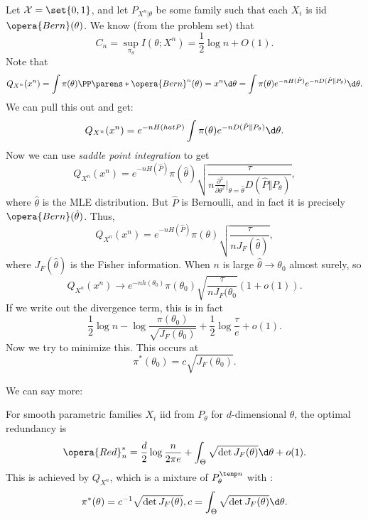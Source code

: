 \begin{exm}
	Let $\mathcal X = \set{0,1}$, and let $P_{X^n|\theta}$ be some family such that each $X_i$ is iid $\opera{Bern}(\theta)$. We know (from the problem set) that \[
		C_n = \sup_{\pi_\theta} I(\theta; X^n) = \frac 12 \log n + O(1).
	\]
	Note that \[
		Q_{X^n}(x^n) = \int \pi(\theta) \PP\parens*{\opera{Bern}^n(\theta) = x^n} \d \theta = \int \pi(\theta) e^{-nH(\hat P)} e^{-nD(\hat P \Vert P_\theta)} \d \theta.
	\]
	We can pull this out and get: \[
		Q_{X^n}(x^n) = e^{-nH(hat P)} \int \pi(\theta) e^{-n D(\hat P \Vert P_\theta)} \d \theta.
	\]
	Now we can use \emph{saddle point integration} to get \[
		Q_{X^n}(x^n) = e^{-n H(\hat P)} \pi(\hat\theta) \sqrt{\frac{\tau}{n \frac{\partial ^2}{\partial \theta^2} |_{\theta = \hat \theta} D(\hat P \Vert P_\theta)}},
	\]
	where $\hat\theta$ is the MLE distribution. But $\hat P$ is Bernoulli, and in fact it is precisely $\opera{Bern}(\hat \theta)$.
	Thus, \[
		Q_{X^n}(x^n) = e^{-nH(\hat P)} \pi(\theta) \sqrt{\frac{\tau}{nJ_F(\hat\theta)}},
	\]
	where $J_F(\hat\theta)$ is the Fisher information. When $n$ is large $\hat \theta \to \theta_0$ almost surely, so \[
		Q_{X^n}(x^n) \to e^{-nh(\theta_0)} \pi(\theta_0)  \sqrt{\frac{\tau}{nJ_F(\theta_0}} (1 + o(1)).
	\]
	If we write out the divergence term, this is in fact \[
		\frac 12 \log n - \log \frac{\pi(\theta_0)}{\sqrt{J_F(\theta_0)}} + \frac 12 \log \frac{\tau}{e} + o(1).
	\]
	Now we try to minimize this.
	This occurs at \[
		\pi^*(\theta_0) = c\sqrt{J_F(\theta_0)}.
	\]
\end{exm}

We can say more:

\begin{thm}
	For smooth parametric families $X_i$ iid from $P_\theta$ for $d$-dimensional $\theta$, the optimal redundancy is \[
		\opera{Red}_n^* = \frac d2 \log \frac{n}{2\pi e} + \int_\Theta \sqrt{\det J_F(\theta)} \d \theta + o(1).
	\]
	This is achieved by $Q_{X^n}$, which is a mixture of $P_\theta^{\tenp n}$ with : \[
		\pi^*(\theta) = c^{-1}\sqrt{\det J_F(\theta)}, c = \int_\Theta \sqrt{\det J_F(\theta)} \d\theta.
	\]
\end{thm}

